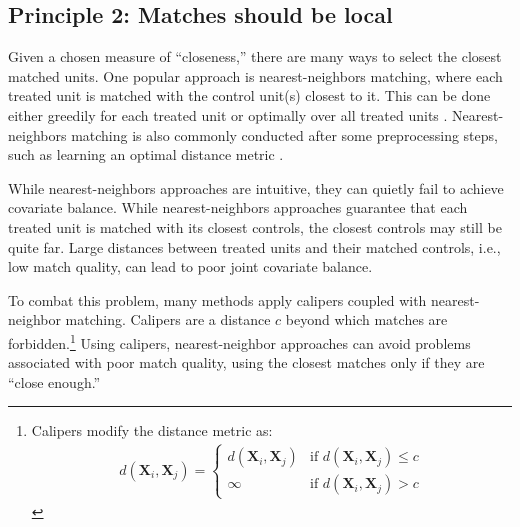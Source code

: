 \documentclass{article}
\newcommand{\bX}{\mathbf{X}}
\begin{document}

\subsection{Principle 2: Matches should be local}
\label{sec:close}

Given a chosen measure of ``closeness,'' there are many ways to select the closest matched units.
One popular approach is nearest-neighbors matching, where each treated unit is matched with the control unit(s) closest to it.
This can be done either greedily for each treated unit \citep{rubin1973matching} or optimally over all treated units \citep{rosenbaum1989optimal}.
Nearest-neighbors matching is also commonly conducted after some preprocessing steps, such as learning an optimal distance metric \citep{diamond2013genetic, parikh2022malts}.

While nearest-neighbors approaches are intuitive, they can quietly fail to achieve covariate balance.
While nearest-neighbors approaches guarantee that each treated unit is matched with its closest controls, the closest controls may still be quite far.
Large distances between treated units and their matched controls, i.e., low match quality, can lead to poor joint covariate balance.

To combat this problem, many methods apply calipers coupled with nearest-neighbor matching.
Calipers are a distance $c$ beyond which matches are forbidden.\footnote{Calipers modify the distance metric as:
\begin{align*}
    d(\bX_i, \bX_j) = 
    \begin{cases}
        d(\bX_i, \bX_j) &\text{if } d(\bX_i, \bX_j) \leq c \\
        \infty &\text{if } d(\bX_i, \bX_j) > c
    \end{cases}
\end{align*}}
Using calipers, nearest-neighbor approaches can avoid problems associated with poor match quality, using the closest matches only if they are ``close enough.''
\end{document}
